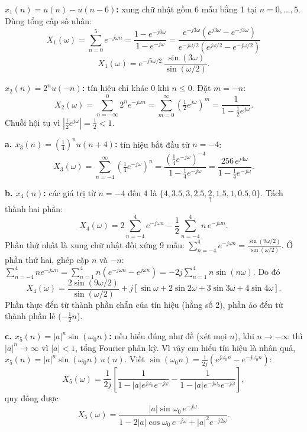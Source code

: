 \documentclass[12pt,a4paper]{article}
\begin{document}
\textbf{$x_1(n) = u(n) - u(n-6)$:} xung chữ nhật gồm 6 mẫu bằng 1 tại $n = 0, \dots, 5$. Dùng tổng cấp số nhân:
\[
    X_1(\omega) = \sum_{n=0}^{5} e^{-j\omega n} = \frac{1 - e^{-j6\omega}}{1 - e^{-j\omega}}
    = \frac{e^{-j3\omega}\left(e^{j3\omega} - e^{-j3\omega}\right)}{e^{-j\omega/2}\left(e^{j\omega/2} - e^{-j\omega/2}\right)}
\]
\begin{equation}
    X_1(\omega) = e^{-j5\omega/2}\, \frac{\sin(3\omega)}{\sin(\omega/2)}.
\end{equation}

\textbf{$x_2(n) = 2^n u(-n)$:} tín hiệu chỉ khác 0 khi $n \le 0$. Đặt $m = -n$:
\begin{equation}
    X_2(\omega) = \sum_{n=-\infty}^{0} 2^n e^{-j\omega n} = \sum_{m=0}^{\infty} \left(\tfrac{1}{2}e^{j\omega}\right)^m = \frac{1}{1 - \frac{1}{2}e^{j\omega}}.
\end{equation}
Chuỗi hội tụ vì $\left|\frac{1}{2}e^{j\omega}\right| = \frac{1}{2} < 1$.

\textbf{a. $x_3(n) = \left(\frac{1}{4}\right)^n u(n+4)$:} tín hiệu bắt đầu từ $n = -4$:
\begin{equation}
    X_3(\omega) = \sum_{n=-4}^{\infty} \left(\tfrac{1}{4}e^{-j\omega}\right)^n
    = \frac{\left(\frac{1}{4}e^{-j\omega}\right)^{-4}}{1 - \frac{1}{4}e^{-j\omega}}
    = \frac{256\, e^{j4\omega}}{1 - \frac{1}{4}e^{-j\omega}}.
\end{equation}

\textbf{b. $x_4(n)$:} các giá trị từ $n = -4$ đến $4$ là $\{4, 3.5, 3, 2.5, \underset{\uparrow}{2}, 1.5, 1, 0.5, 0\}$. Tách thành hai phần:
\[
    X_4(\omega) = 2\sum_{n=-4}^{4} e^{-j\omega n} - \frac{1}{2}\sum_{n=-4}^{4} n\, e^{-j\omega n}.
\]
Phần thứ nhất là xung chữ nhật đối xứng 9 mẫu: $\sum_{n=-4}^{4} e^{-j\omega n} = \frac{\sin(9\omega/2)}{\sin(\omega/2)}$. Ở phần thứ hai, ghép cặp $n$ và $-n$: $\sum_{n=-4}^{4} n e^{-j\omega n} = \sum_{n=1}^{4} n\left(e^{-j\omega n} - e^{j\omega n}\right) = -2j\sum_{n=1}^{4} n\sin(n\omega)$. Do đó
\begin{equation}
    X_4(\omega) = \frac{2\sin(9\omega/2)}{\sin(\omega/2)} + j\left[\sin\omega + 2\sin 2\omega + 3\sin 3\omega + 4\sin 4\omega\right].
\end{equation}
Phần thực đến từ thành phần chẵn của tín hiệu (hằng số 2), phần ảo đến từ thành phần lẻ ($-\frac{1}{2}n$).

\textbf{c. $x_5(n) = |a|^n \sin(\omega_0 n)$:} nếu hiểu đúng như đề (xét mọi $n$), khi $n \to -\infty$ thì $|a|^n \to \infty$ vì $|a| < 1$, tổng Fourier phân kỳ. Vì vậy em hiểu tín hiệu là nhân quả, $x_5(n) = |a|^n \sin(\omega_0 n)\, u(n)$. Viết $\sin(\omega_0 n) = \frac{1}{2j}\left(e^{j\omega_0 n} - e^{-j\omega_0 n}\right)$:
\[
    X_5(\omega) = \frac{1}{2j}\left[\frac{1}{1 - |a| e^{j\omega_0} e^{-j\omega}} - \frac{1}{1 - |a| e^{-j\omega_0} e^{-j\omega}}\right],
\]
quy đồng được
\begin{equation}
    X_5(\omega) = \frac{|a| \sin\omega_0\, e^{-j\omega}}{1 - 2|a|\cos\omega_0\, e^{-j\omega} + |a|^2 e^{-j2\omega}}.
\end{equation}
\end{document}

